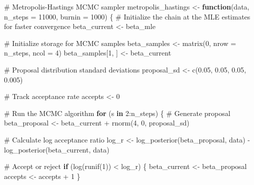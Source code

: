 \documentclass[
  letterpaper,
  DIV=11,
  numbers=noendperiod]{scrartcl}
\newenvironment{Shaded}{\begin{snugshade}}{\end{snugshade}}
\newcommand{\AttributeTok}[1]{\textcolor[rgb]{0.40,0.45,0.13}{#1}}
\newcommand{\CommentTok}[1]{\textcolor[rgb]{0.37,0.37,0.37}{#1}}
\newcommand{\ControlFlowTok}[1]{\textcolor[rgb]{0.00,0.23,0.31}{\textbf{#1}}}
\newcommand{\DecValTok}[1]{\textcolor[rgb]{0.68,0.00,0.00}{#1}}
\newcommand{\FloatTok}[1]{\textcolor[rgb]{0.68,0.00,0.00}{#1}}
\newcommand{\FunctionTok}[1]{\textcolor[rgb]{0.28,0.35,0.67}{#1}}
\newcommand{\NormalTok}[1]{\textcolor[rgb]{0.00,0.23,0.31}{#1}}
\newcommand{\OtherTok}[1]{\textcolor[rgb]{0.00,0.23,0.31}{#1}}
\newcommand{\SpecialCharTok}[1]{\textcolor[rgb]{0.37,0.37,0.37}{#1}}
\begin{document}
\begin{Shaded}
\begin{Highlighting}[]
\CommentTok{\# Metropolis{-}Hastings MCMC sampler}
\NormalTok{metropolis\_hastings }\OtherTok{\textless{}{-}} \ControlFlowTok{function}\NormalTok{(data, }\AttributeTok{n\_steps =} \DecValTok{11000}\NormalTok{, }\AttributeTok{burnin =} \DecValTok{1000}\NormalTok{) \{}
  \CommentTok{\# Initialize the chain at the MLE estimates for faster convergence}
\NormalTok{  beta\_current }\OtherTok{\textless{}{-}}\NormalTok{ beta\_mle}
  
  \CommentTok{\# Initialize storage for MCMC samples}
\NormalTok{  beta\_samples }\OtherTok{\textless{}{-}} \FunctionTok{matrix}\NormalTok{(}\DecValTok{0}\NormalTok{, }\AttributeTok{nrow =}\NormalTok{ n\_steps, }\AttributeTok{ncol =} \DecValTok{4}\NormalTok{)}
\NormalTok{  beta\_samples[}\DecValTok{1}\NormalTok{, ] }\OtherTok{\textless{}{-}}\NormalTok{ beta\_current}
  
  \CommentTok{\# Proposal distribution standard deviations}
\NormalTok{  proposal\_sd }\OtherTok{\textless{}{-}} \FunctionTok{c}\NormalTok{(}\FloatTok{0.05}\NormalTok{, }\FloatTok{0.05}\NormalTok{, }\FloatTok{0.05}\NormalTok{, }\FloatTok{0.005}\NormalTok{)}
  
  \CommentTok{\# Track acceptance rate}
\NormalTok{  accepts }\OtherTok{\textless{}{-}} \DecValTok{0}
  
  \CommentTok{\# Run the MCMC algorithm}
  \ControlFlowTok{for}\NormalTok{ (s }\ControlFlowTok{in} \DecValTok{2}\SpecialCharTok{:}\NormalTok{n\_steps) \{}
    \CommentTok{\# Generate proposal}
\NormalTok{    beta\_proposal }\OtherTok{\textless{}{-}}\NormalTok{ beta\_current }\SpecialCharTok{+} \FunctionTok{rnorm}\NormalTok{(}\DecValTok{4}\NormalTok{, }\DecValTok{0}\NormalTok{, proposal\_sd)}
    
    \CommentTok{\# Calculate log acceptance ratio}
\NormalTok{    log\_r }\OtherTok{\textless{}{-}} \FunctionTok{log\_posterior}\NormalTok{(beta\_proposal, data) }\SpecialCharTok{{-}} \FunctionTok{log\_posterior}\NormalTok{(beta\_current, data)}
    
    \CommentTok{\# Accept or reject}
    \ControlFlowTok{if}\NormalTok{ (}\FunctionTok{log}\NormalTok{(}\FunctionTok{runif}\NormalTok{(}\DecValTok{1}\NormalTok{)) }\SpecialCharTok{\textless{}}\NormalTok{ log\_r) \{}
\NormalTok{      beta\_current }\OtherTok{\textless{}{-}}\NormalTok{ beta\_proposal}
\NormalTok{      accepts }\OtherTok{\textless{}{-}}\NormalTok{ accepts }\SpecialCharTok{+} \DecValTok{1}
\NormalTok{    \}}
    

\end{Highlighting}
\end{Shaded}
\end{document}
